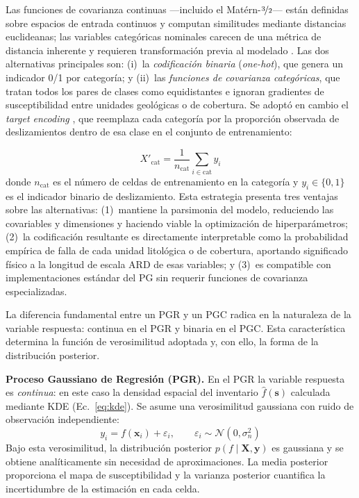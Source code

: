 \documentclass[12pt, a4paper]{article}
\begin{document}
Las funciones de covarianza continuas ---incluido el Matérn-$\nicefrac{3}{2}$--- están definidas sobre espacios de entrada continuos y
computan similitudes mediante distancias euclideanas; las variables categóricas nominales carecen de una métrica de distancia
inherente y requieren transformación previa al modelado \citep{GarridoMerchan2020, Rasmussen2006}. Las dos alternativas
principales son: (i)~la \textit{codificación binaria} (\textit{one-hot}), que genera un indicador 0/1 por categoría; y 
(ii)~las \textit{funciones de covarianza categóricas}, que tratan todos los pares de clases como
equidistantes e ignoran gradientes de susceptibilidad entre unidades geológicas o de cobertura. Se adoptó en cambio el
 \textit{target encoding} \citep{MicciBarreca2001}, que reemplaza cada categoría por la proporción
observada de deslizamientos dentro de esa clase en el conjunto de entrenamiento:

\begin{equation}
    X'_{\mathrm{cat}} = \frac{1}{n_{\mathrm{cat}}} \sum_{i \in \mathrm{cat}} y_i
    \label{eq:target}
\end{equation}
donde $n_{\mathrm{cat}}$ es el número de celdas de entrenamiento en la categoría y $y_i \in \{0,1\}$ es el indicador binario de
deslizamiento. Esta estrategia presenta tres ventajas sobre las alternativas: (1)~mantiene la parsimonia del modelo, reduciendo
las covariables y dimensiones y haciendo viable la optimización de hiperparámetros; (2)~la codificación resultante es directamente
interpretable como la probabilidad empírica de falla de cada unidad litológica o de cobertura, aportando significado físico a la
longitud de escala ARD de esas variables; y (3)~es compatible con implementaciones estándar del PG sin requerir funciones de covarianza
especializadas.

La diferencia fundamental entre un PGR y un PGC radica en la naturaleza de la variable respuesta: continua
en el PGR y binaria en el PGC. Esta característica determina la función de verosimilitud adoptada y, con
ello, la forma de la distribución posterior.

\textbf{Proceso Gaussiano de Regresión (PGR).} En el PGR la variable respuesta es
\textit{continua}: en este caso la densidad espacial del inventario $\hat{f}(\mathbf{s})$ calculada mediante KDE
(Ec.~\ref{eq:kde}). Se asume una verosimilitud gaussiana con ruido de observación independiente:
\begin{equation}
    y_i = f(\mathbf{x}_i) + \varepsilon_i, \qquad \varepsilon_i \sim \mathcal{N}(0,\sigma_n^2)
    \label{eq:pgr}
\end{equation}
Bajo esta verosimilitud, la distribución posterior $p(f\mid\mathbf{X},\mathbf{y})$ es gaussiana y se
obtiene analíticamente sin necesidad de aproximaciones. La media posterior proporciona el mapa de
susceptibilidad y la varianza posterior cuantifica la incertidumbre de la estimación en cada celda.
\end{document}
